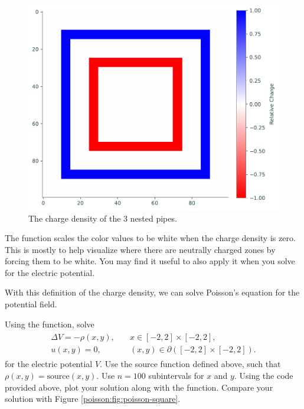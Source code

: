 \begin{figure}
\includegraphics[scale=0.7]{figures/relative_charge.pdf}
\caption{The charge density of the 3 nested pipes.}
\end{figure}


The function  scales the color values to be white when the charge density is zero.
This is mostly to help visualize where there are neutrally charged zones by forcing them to be white.
You may find it useful to also apply it when you solve for the electric  potential.

With this definition of the charge density, we can solve Poisson's equation for the potential field.

\begin{problem}
Using the  function, solve
\begin{align}
	\begin{split}
	\Delta V = -\rho(x,y), &{}\quad x \in [-2,2]\times [-2,2],\\
	u(x,y) = 0, &{}\quad (x,y) \in \partial ([-2,2]\times [-2,2]).
	\end{split}
	\label{poisson2d:source}
\end{align}
%
for the electric potential $V.$
Use the source function defined above, such that $\rho(x,y) = \text{source}(x,y)$.
Use $n=100$ subintervals for $x$ and $y$.
Using the code provided above, plot your solution along with the  function.
Compare your solution with Figure \ref{poisson:fig:poisson-square}.
\end{problem}

